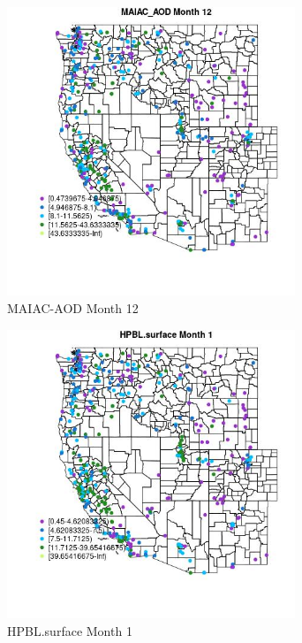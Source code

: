 \clearpage 

\begin{figure} 
\centering  
\includegraphics[width=0.77\textwidth]{Code_Outputs/ML_input_report_ML_input_PM25_Step5_part_d_de_duplicated_aves_ML_input_MapObsMo12MAIAC_AOD.jpg} 
\caption{\label{fig:ML_input_report_ML_input_PM25_Step5_part_d_de_duplicated_aves_ML_inputMapObsMo12MAIAC_AOD}MAIAC-AOD Month 12} 
\end{figure} 
 

\begin{figure} 
\centering  
\includegraphics[width=0.77\textwidth]{Code_Outputs/ML_input_report_ML_input_PM25_Step5_part_d_de_duplicated_aves_ML_input_MapObsMo1HPBLsurface.jpg} 
\caption{\label{fig:ML_input_report_ML_input_PM25_Step5_part_d_de_duplicated_aves_ML_inputMapObsMo1HPBLsurface}HPBL.surface Month 1} 
\end{figure} 
 

